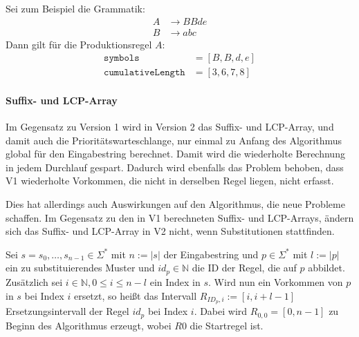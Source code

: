 Sei zum Beispiel die Grammatik: 
\begin{align*}
	A &\rightarrow BBde\\
	B &\rightarrow abc
\end{align*}
Dann gilt für die Produktionsregel $A$: 
\begin{align*}
	\texttt{symbols} &= [B, B, d, e]\\
	\texttt{cumulativeLength} &= [3, 6, 7, 8]
\end{align*}

\paragraph{Suffix- und LCP-Array}
Im Gegensatz zu Version 1 wird in Version 2 das Suffix- und LCP-Array, und damit auch die Prioritätswarteschlange, nur einmal zu Anfang des Algorithmus global für den Eingabestring berechnet. Damit wird die wiederholte Berechnung in jedem Durchlauf gespart. 
Dadurch wird ebenfalls das Problem behoben, dass V1 wiederholte Vorkommen, die nicht in derselben Regel liegen, nicht erfasst.

Dies hat allerdings auch Auswirkungen auf den Algorithmus, die neue Probleme schaffen. Im Gegensatz zu den in V1 berechneten Suffix- und LCP-Arrays, ändern sich das Suffix- und LCP-Array in V2 nicht, wenn Substitutionen stattfinden. 

Sei $s = s_0, \dots, s_{n-1} \in \Sigma^*$ mit $n := |s|$ der Eingabestring und $p \in \Sigma^*$ mit $l := |p|$  ein zu substituierendes Muster und $id_p \in \mathbb{N}$ die ID der Regel, die auf $p$ abbildet. Zusätzlich sei $i \in \mathbb{N}, 0 \leq i \leq n - l$ ein Index in $s$. Wird nun ein Vorkommen von $p$ in $s$ bei Index $i$ ersetzt, so heißt das Intervall $R_{ID_p, i} := [i, i + l - 1]$ Ersetzungsintervall der Regel $id_p$ bei Index $i$. Dabei wird $R_{0, 0} = [0, n-1]$ zu Beginn des Algorithmus erzeugt, wobei $R0$ die Startregel ist. \\

